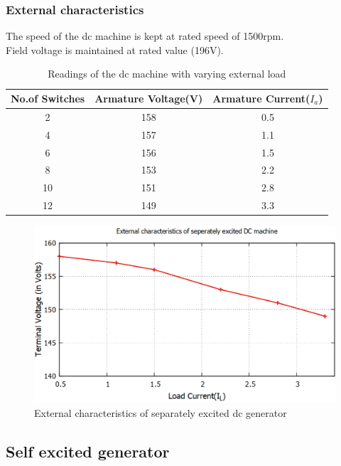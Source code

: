 \documentclass[12pt]{article}
\begin{document}
    \subsubsection{External characteristics}
    The speed of the dc machine is kept at rated speed of 1500rpm.\\
    Field voltage is maintained at rated value (196V).
    \begin{table}[ht]
        \centering
        \begin{tabular}{|c|c|c|}
          \hline
            \hline
            No.of Switches & Armature Voltage(V) & Armature Current($I_a$) \\
            \hline
            \hline
            2 &	158	& 0.5\\
            4 &	157	& 1.1\\
            6 &	156	& 1.5\\
            8 &	153 &	2.2\\
            10 &	151 & 2.8\\
            12 &	149 & 3.3\\
            \hline
        \end{tabular}
        \caption{Readings of the dc machine with varying external load}
        \label{tab:my_label}
    \end{table}
    \begin{figure}[ht]
        \centering
        \includegraphics[scale=0.45]{esp.png}
        \caption{External characteristics of separately excited dc generator}
        \label{fig:my_label}
    \end{figure}
    
    \newpage
    \subsection{Self excited generator}
\end{document}
